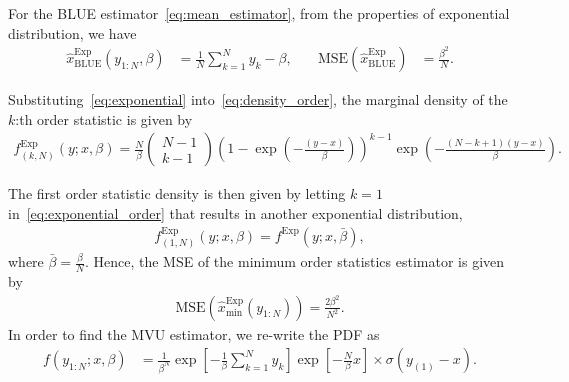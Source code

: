 \documentclass{article}
\newcommand{\MSE}{\mathrm{MSE}}
\begin{document}
For the BLUE estimator~\eqref{eq:mean_estimator}, from the properties of exponential distribution, we have
%
%
\begin{align}
\hat{x}_{\mathrm{BLUE}}^{\mathrm{Exp}}(y_{1:N},\beta) &= \frac{1}{N}\sum_{k=1}^{N}y_k - \beta,
&\quad 
\MSE(\hat{x}_{\mathrm{BLUE}}^{\mathrm{Exp}}) &= \frac{\beta^2}{N}.
\end{align}
%
%

Substituting~\eqref{eq:exponential} into~\eqref{eq:density_order}, the marginal density of the $k$:th order statistic is given by
%
%
\begin{align}
f^{\mathrm{Exp}}_{(k,N)}(y;x,\beta) = \frac{N}{\beta}\begin{pmatrix}N-1\\k-1\end{pmatrix}\left(1-\exp(-\frac{(y-x)}{\beta})\right)^{k-1}\exp\left(-\frac{(N-k+1)(y-x)}{\beta}\right).
\label{eq:exponential_order}
\end{align}
%
%

The first order statistic density is then given by letting $k=1$ in~\eqref{eq:exponential_order} that results in another exponential distribution,
%
%
\begin{align}
f^{\mathrm{Exp}}_{(1,N)}(y;x,\beta) = f^{\mathrm{Exp}}(y;x,\bar{\beta}),
\end{align}
%
%
where $\bar{\beta}=\frac{\beta}{N}$. Hence, the MSE of the minimum order statistics estimator is given by
%
%
\begin{align}
\MSE\left(\hat{x}_{\mathrm{min}}^{\mathrm{Exp}}(y_{1:N})\right) = \frac{2\beta^2}{N^2}.
\end{align}
%
%
In order to find the MVU estimator, we re-write the PDF as
%
%
\begin{align}
f(y_{1:N};x,\beta) &= \frac{1}{\beta^N}\exp\left[-\frac{1}{\beta}\sum_{k=1}^{N}y_k\right]\exp\left[-\frac{N}{\beta}x\right]\times\sigma(y_{(1)} - x).
\label{eq:exponential_pdf_2}
\end{align}
%
%
\end{document}
